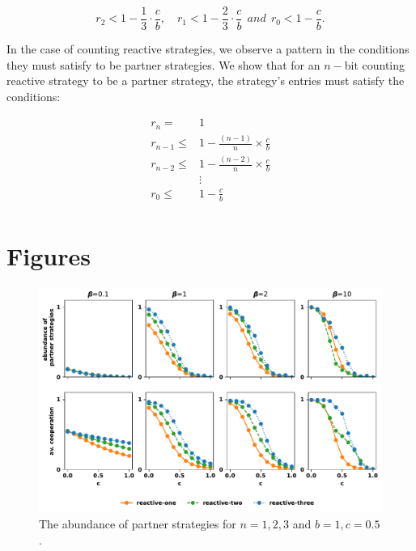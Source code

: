 \documentclass{article}
\theoremstyle{definition}
\begin{document}
\begin{equation}\label{eq:counting_three_bit_conditions}
  \displaystyle r_2 < 1- \frac{1}{3} \cdot \frac{c}{b}, \quad r_1 < 1- \frac{2}{3} \cdot \frac{c}{b} ~~and~~ r_0 < 1\!-\! \frac{c}{b}.
\end{equation}


In the case of counting reactive strategies, we observe a pattern in the
conditions they must satisfy to be partner strategies. We show that for an $n-$bit
counting reactive strategy to be a partner strategy, the strategy's entries must
satisfy the conditions:

\begin{align*}
    r_{n}   = & 1 \\
    r_{n-1} \leq & 1  - \frac{(n - 1)}{n} \times \frac{c}{b}\\
    r_{n-2} \leq & 1  - \frac{(n - 2)}{n} \times \frac{c}{b}\\
    & \vdots \\
    r_{0} \leq &  1  - \frac{c}{b}\\
\end{align*}

\section{Figures}


\begin{figure}[!htbp]
  \includegraphics[width=\textwidth]{figures/abundance_of_partner_strategies.pdf}
  \caption{The abundance of partner strategies for $n=1,2,3$ and $b=1, c=0.5$.}
\end{figure}
\end{document}
